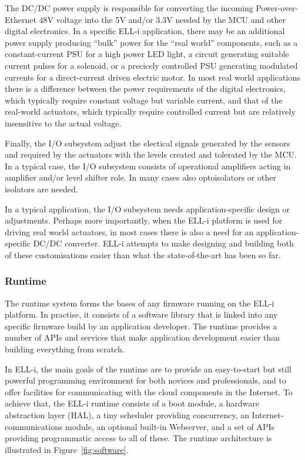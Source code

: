 \documentclass[final]{siamltex}
\begin{document}
The DC/DC power supply is responsible for converting the incoming
Power-over-Ethernet 48V voltage into the 5V and/or 3.3V needed by the
MCU and other digital electronics.  In a specific ELL-i application,
there may be an additional power supply producing ``bulk'' power for
the ``real world'' components, such as a constant-current PSU for a
high power LED light, a circuit generating suitable current pulses for
a solenoid, or a precicely controlled PSU generating modulated
currents for a direct-current driven electric motor.  In most real
world applications there is a difference between the power
requirements of the digital electronics, which typically require
constant voltage but variable current, and that of the real-world
actuators, which typically require controlled current but are
relatively insensitive to the actual voltage.

Finally, the I/O subsystem adjust the electical signals generated by
the sensors and required by the actuators with the levels created and
tolerated by the MCU.  In a typical case, the I/O subsystem consists
of operational amplifiers acting in amplifier and/or level shifter
role.  In many cases also optoisolators or other isolators are needed.

In a typical application, the I/O subsystem needs application-specific
design or adjustments.  Perhaps more importantly, when the ELL-i
platform is used for driving real world actuators, in most cases there
is also a need for an application-specific DC/DC converter.  ELL-i
attempts to make designing and building both of these customisations
easier than what the state-of-the-art has been so far.

\subsubsection{Runtime}
\label{sssec:runtime}

The runtime system forms the bases of any firmware running on the
ELL-i platform.  In practise, it consists of a software library that
is linked into any specific firmware build by an application
developer.  The runtime provides a number of APIs and services that make
application development easier than building everything from scratch.

In ELL-i, the main goals of the runtime are to provide an
easy-to-start but still powerful programming environment for both
novices and professionals, and to offer facilities for communicating
with the cloud components in the Internet.  To achieve that, the ELL-i
runtime consists of a boot module, a hardware abstraction layer (HAL),
a tiny scheduler providing concurrency, an Internet-communications
module, an optional built-in Webserver, and a set of APIs providing
programmatic access to all of these.  The runtime architecture is
illustrated in Figure~\ref{fig:software}.
\end{document}
